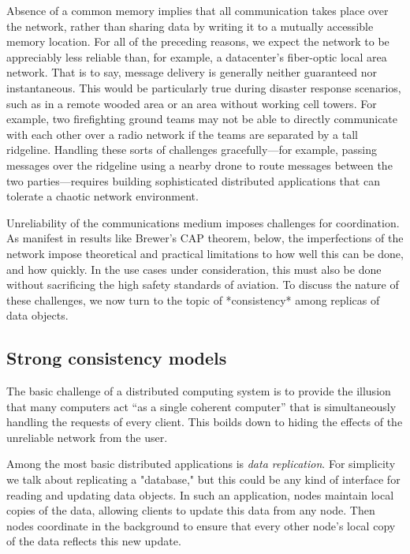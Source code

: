 Absence of a common memory implies that all communication takes place
over the network, rather than sharing data by writing it to a mutually
accessible memory location. For all of the preceding reasons, we
expect the network to be appreciably less reliable than, for example,
a datacenter's fiber-optic local area network. That is to say, message
delivery is generally neither guaranteed nor instantaneous. This would
be particularly true during disaster response scenarios, such as in a
remote wooded area or an area without working cell towers. For
example, two firefighting ground teams may not be able to directly
communicate with each other over a radio network if the teams are
separated by a tall ridgeline. Handling these sorts of challenges
gracefully---for example, passing messages over the ridgeline using a
nearby drone to route messages between the two parties---requires
building sophisticated distributed applications that can tolerate a
chaotic network environment.

Unreliability of the communications medium imposes challenges for
coordination. As manifest in results like Brewer's CAP theorem, below,
the imperfections of the network impose theoretical and practical
limitations to how well this can be done, and how quickly. In the use
cases under consideration, this must also be done without sacrificing
the high safety standards of aviation. To discuss the nature of these
challenges, we now turn to the topic of *consistency* among replicas
of data objects.

\subsection{Strong consistency models}

The basic challenge of a distributed computing system is to provide
the illusion that many computers act ``as a single coherent computer''
\cite{TanenbaumSteen07} that is simultaneously handling the requests
of every client. This boilds down to hiding the effects of the
unreliable network from the user.

Among the most basic distributed applications is \emph{data
replication}.  For simplicity we talk about replicating a "database,"
but this could be any kind of interface for reading and updating data
objects. In such an application, nodes maintain local copies of the
data, allowing clients to update this data from any node. Then nodes
coordinate in the background to ensure that every other node's local
copy of the data reflects this new update.

